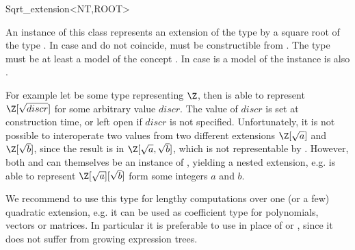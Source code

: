 
\begin{ccRefClass}{Sqrt_extension<NT,ROOT>}

\ccDefinition

An instance of this class represents an extension of the type  by a 
square root of the type . 
In case  and  do not coincide, 
 must be constructible from . 
The type  must be at least a model of the concept 
. 
In case  is a model of  the instance is also 
.

For example let  be some type representing $\Z$, then 
 is able to represent $\Z[\sqrt{discr}]$
for some arbitrary value $discr$. The value of $discr$ is set at 
construction time, or left open if $discr$ is not specified.
Unfortunately, it is not possible
to interoperate two values from two different extensions $\Z[\sqrt{a}]$ and 
$\Z[\sqrt{b}]$,
since the result is in $\Z[\sqrt{a},\sqrt{b}]$, which is not representable by 
. 
However, both  and  can themselves be an instance of
, yielding a nested extension,
e.g.  is able to represent 
$\Z[\sqrt{a}][\sqrt{b}]$ form some integers $a$ and $b$. 


We recommend to use this type for lengthy computations over one (or a few) quadratic 
extension, e.g. it can be used as coefficient type for polynomials, 
vectors or matrices. In particular it is preferable to use 
 in place of  or , 
since it does not suffer from growing expression trees.




\end{ccRefClass}
